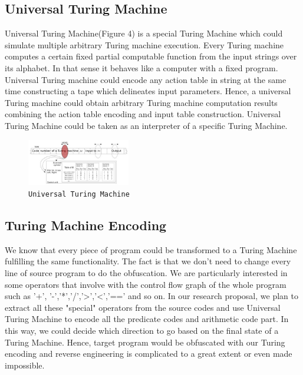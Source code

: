 \documentclass{sig-alternate-05-2015}
\begin{document}
\subsection{Universal Turing Machine}
Universal Turing Machine(Figure 4) is a special Turing Machine which could simulate multiple arbitrary Turing machine execution.  Every Turing machine computes a certain fixed partial computable function from the input strings over its alphabet. In that sense it behaves like a computer with a fixed program\cite{WEB:UTM}. Universal Turing machine could encode any action table in string at the same time constructing a tape which delineates input parameters. Hence, a universal Turing machine could obtain arbitrary Turing machine computation results combining the action table encoding and input table construction. Universal Turing Machine could be taken as an interpreter of a specific Turing Machine.
\begin{figure}
\centering
\includegraphics[width=0.4\textwidth]{UTM}
\caption{\texttt{Universal Turing Machine} }
\end{figure}

\subsection{Turing Machine Encoding}
We know that every piece of program could be transformed to a Turing Machine fulfilling the same functionality. The fact is that we don't need to change every line of source program to do the obfuscation. We are particularly interested in some operators that involve with the control flow graph of the whole program such as '+', '-','*','/','>','<','==' and so on. In our research proposal, we plan to extract all these "special" operators from the source codes and use Universal Turing Machine to encode all the predicate codes and arithmetic code part. In this way, we could decide which direction to go based on the final state of a Turing Machine. Hence, target program would be obfuscated with our Turing encoding and reverse engineering is complicated to a great extent or even made impossible.
\end{document}
